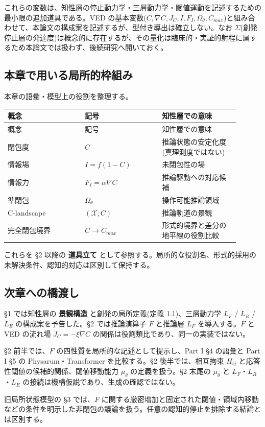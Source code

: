 これらの変数は、知性層の停止動力学・三層動力学・閾値運動を記述するための最小限の追加道具である。VED の基本変数($C, \nabla C, J_C, I, F_I, \Omega_\theta, C_{max}$)と組み合わせて、本論文の構成案を記述するが、型付き導出は確立しない。なお $\Sigma$(創発停止層の発達度)は概念的に存在するが、その量化は臨床的・実証的射程に属するため本論文では扱わず、後続研究へ開いておく。

\bigskip


\subsection{本章で用いる局所的枠組み}


本章の語彙・模型上の役割を整理する。

\begin{longtable}{@{}p{0.30\linewidth}p{0.30\linewidth}p{0.30\linewidth}@{}}
\toprule
概念 & 記号 & 知性層での意味 \\
\midrule
\endfirsthead
\toprule
概念 & 記号 & 知性層での意味 \\
\midrule
\endhead
閉包度 & $C$ & 推論状態の安定化度(真理測度ではない) \\
情報場 & $I = f(1-C)$ & 未閉包性の場 \\
情報力 & $F_I = \alpha \nabla C$ & 推論駆動への対応候補 \\
準閉包 & $\Omega_\theta$ & 操作可能推論領域 \\
C-landscape & $(\mathcal{X}, C)$ & 推論軌道の景観 \\
完全閉包境界 & $C \to C_{max}$ & 形式的境界と差分の地平線の役割比較 \\
\bottomrule
\end{longtable}


これらを \S{}2 以降の \textbf{道具立て} として参照する。局所的な役割名、形式的採用の未解決条件、認知的対応は区別して保持する。

\bigskip


\subsection{次章への橋渡し}


\S{}1 では知性層の \textbf{景観構造} と創発の局所定義(定義 1.1)、三層動力学 $L_F$ / $L_R$ / $L_E$ の構成案を予告した。\S{}2 では推論演算子 $F$ と推論層 $L_F$ を導入する。$F$ と VED の流れ場 $J_C = -\xi \nabla C$ の関係は役割類比であり、同一の実装ではない。

\S{}2 前半では、$F$ の四性質を局所的な記述として提示し、Part I \S{}4 の語彙と Part I \S{}5 の Physarum・Transformer を比較する。\S{}2 後半では、相互拘束 $H_{ij}$ と応答性閾値の候補的関係、閾値移動能力 $\mu_\theta$ の定義を扱う。\S{}2 末尾の $\mu_\theta$ と $L_F$・$L_R$・$L_E$ の接続は機構仮説であり、生成の確認ではない。

旧局所状態模型の \S{}3 では、$F$ に関する厳密増加と固定された閾値・領域内移動などの条件を明示した非閉包の議論を扱う。任意の認知的停止を排除する結論とは区別する。

\bigskip
